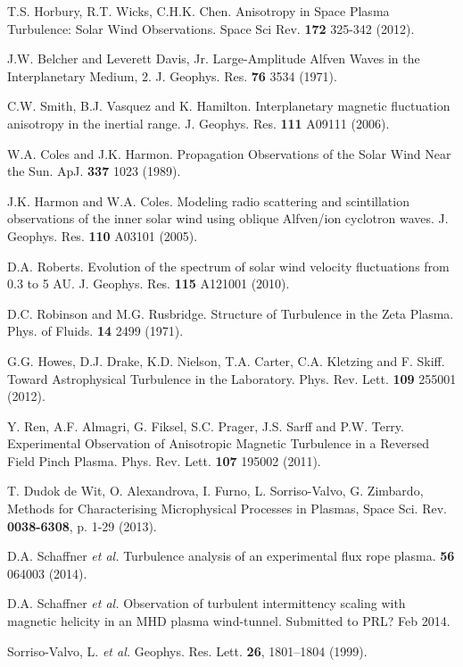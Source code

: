\documentclass[aip,prl,amsmath,amssymb,reprint,superscriptaddress]{revtex4-1} %
\begin{document}
\begin{thebibliography}{99}
 T.S. Horbury, R.T. Wicks, C.H.K. Chen. Anisotropy in Space Plasma Turbulence: Solar Wind Observations. Space Sci Rev. {\bf 172} 325-342 (2012).

 J.W. Belcher and Leverett Davis, Jr. Large-Amplitude Alfven Waves in the Interplanetary Medium, 2. J. Geophys. Res. {\bf 76} 3534 (1971).

 C.W. Smith, B.J. Vasquez and K. Hamilton. Interplanetary magnetic fluctuation anisotropy in the inertial range. J. Geophys. Res. {\bf 111} A09111 (2006).

 W.A. Coles and J.K. Harmon. Propagation Observations of the Solar Wind Near the Sun. ApJ. {\bf 337} 1023 (1989).

 J.K. Harmon and W.A. Coles. Modeling radio scattering and scintillation observations of the inner solar wind using oblique Alfven/ion cyclotron waves. J. Geophys. Res. {\bf 110} A03101 (2005).

 D.A. Roberts. Evolution of the spectrum of solar wind velocity fluctuations from 0.3 to 5 AU. J. Geophys. Res. {\bf 115} A121001 (2010).

 D.C. Robinson and M.G. Rusbridge. Structure of Turbulence in the Zeta Plasma. Phys. of Fluids. {\bf 14} 2499 (1971).

 G.G. Howes, D.J. Drake, K.D. Nielson, T.A. Carter, C.A. Kletzing and F. Skiff. Toward Astrophysical Turbulence in the Laboratory. Phys. Rev. Lett. {\bf 109} 255001 (2012).

 Y. Ren, A.F. Almagri, G. Fiksel, S.C. Prager, J.S. Sarff and P.W. Terry. Experimental Observation of Anisotropic Magnetic Turbulence in a Reversed Field Pinch Plasma. Phys. Rev. Lett. {\bf 107} 195002 (2011).

 T. Dudok de Wit, O. Alexandrova, I. Furno, L. Sorriso-Valvo, G. Zimbardo, Methods for Characterising Microphysical Processes in Plasmas, Space Sci. Rev. {\bf 0038-6308}, p. 1-29 (2013).

 D.A. Schaffner {\it et al.} Turbulence analysis of an experimental flux rope plasma. {\bf 56} 064003 (2014).

 D.A. Schaffner {\it et al.} Observation of turbulent intermittency scaling with magnetic helicity in an MHD plasma wind-tunnel. Submitted to PRL? Feb 2014.

Sorriso-Valvo, L. {\it et al.} Geophys. Res. Lett. {\bf 26}, 1801–1804 (1999).


\end{thebibliography}
\end{document}
